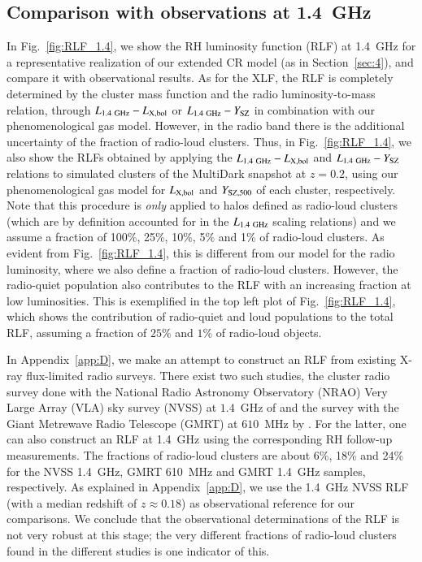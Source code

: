 \documentclass[useAMS,usenatbib]{mn2e}
\begin{document}
\subsection{Comparison with observations at 1.4~GHz}

In Fig.~\ref{fig:RLF_1.4}, we show the RH luminosity function (RLF) at 1.4~GHz
for a representative realization of our extended CR model (as in
Section~\ref{sec:4}), and compare it with observational results. As for the XLF,
the RLF is completely determined by the cluster mass function and the radio
luminosity-to-mass relation, through $L_{1.4~{\mathrm{GHz}}}-L_{ {\mathrm{X,bol}}}$ or
$L_{1.4~{\mathrm{GHz}}}-Y_{{\mathrm{SZ}}}$ in combination with our phenomenological gas
model. However, in the radio band there is the additional uncertainty of the
fraction of radio-loud clusters. Thus, in Fig.~\ref{fig:RLF_1.4}, we also show
the RLFs obtained by applying the $L_{1.4~{\mathrm{GHz}}}-L_{{\mathrm{X,bol}}}$ and
$L_{1.4~{\mathrm{GHz}}}-Y_{{\mathrm{SZ}}}$ relations to simulated clusters of the
MultiDark snapshot at $z = 0.2$, using our phenomenological gas model for
$L_{{\mathrm{X,bol}}}$ and $Y_{{\mathrm{SZ}}, 500}$ of each cluster, respectively. Note
that this procedure is {\em only} applied to halos defined as radio-loud
clusters (which are by definition accounted for in the $L_{1.4~{\mathrm{GHz}}}$
scaling relations) and we assume a fraction of 100\%, 25\%, 10\%, 5\% and 1\% of
radio-loud clusters. As evident from Fig.~\ref{fig:RLF_1.4}, this is different
from our model for the radio luminosity, where we also define a fraction of
radio-loud clusters. However, the radio-quiet population also contributes to the
RLF with an increasing fraction at low luminosities. This is exemplified in the
top left plot of Fig.~\ref{fig:RLF_1.4}, which shows the contribution of
radio-quiet and loud populations to the total RLF, assuming a fraction of $25\%$
and $1\%$ of radio-loud objects.

In Appendix~\ref{app:D}, we make an attempt to construct an RLF from existing
X-ray flux-limited radio surveys. There exist two such studies, the cluster
radio survey done with the National Radio Astronomy Observatory (NRAO) Very
Large Array (VLA) sky survey (NVSS) at $1.4$~GHz of \cite{1999NewA....4..141G}
and the survey with the Giant Metrewave Radio Telescope (GMRT) at $610$~MHz by
\cite{VenturiGMRT_1,VenturiGMRT_2}. For the latter, one can also construct an RLF
at 1.4~GHz using the corresponding RH follow-up measurements. The fractions of
radio-loud clusters are about 6\%, 18\% and 24\% for the NVSS 1.4~GHz, GMRT
610~MHz and GMRT 1.4~GHz samples, respectively. As explained in
Appendix~\ref{app:D}, we use the 1.4~GHz NVSS RLF (with a median redshift of $z
\approx 0.18$) as observational reference for our comparisons. We conclude that
the observational determinations of the RLF is not very robust at this stage;
the very different fractions of radio-loud clusters found in the different
studies is one indicator of this.
  
\end{document}
